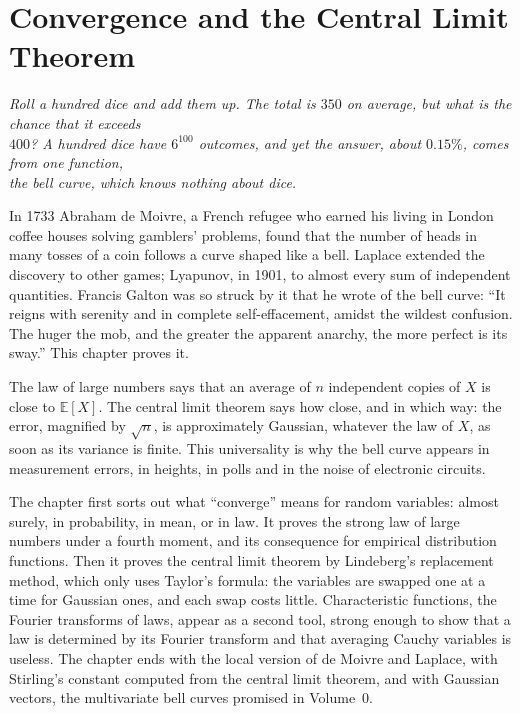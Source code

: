 \chapter{Convergence and the Central Limit Theorem}

\begin{center}\itshape
Roll a hundred dice and add them up. The total is $350$ on average, but what is the chance that it exceeds\\
$400$? A hundred dice have $6^{100}$ outcomes, and yet the answer, about $0.15\%$, comes from one function,\\
the bell curve, which knows nothing about dice.
\end{center}

In 1733 Abraham de Moivre, a French refugee who earned his living in London coffee houses solving gamblers' problems, found that the number of heads
in many tosses of a coin follows a curve shaped like a bell. Laplace extended the discovery to other games; Lyapunov, in 1901, to almost every sum of
independent quantities. Francis Galton was so struck by it that he wrote of the bell curve: ``It reigns with serenity and in complete self-effacement,
amidst the wildest confusion. The huger the mob, and the greater the apparent anarchy, the more perfect is its sway.'' This chapter proves it.

The law of large numbers says that an average of $n$ independent copies of $X$ is close to $\mathbb E[X]$. The central
limit theorem says how close, and in which way: the error, magnified by $\sqrt n$, is approximately Gaussian, whatever
the law of $X$, as soon as its variance is finite. This universality is why the bell curve appears in measurement
errors, in heights, in polls and in the noise of electronic circuits.

The chapter first sorts out what ``converge'' means for random variables: almost surely, in probability, in mean,
or in law. It proves the strong law of large numbers under a fourth moment, and its consequence for empirical
distribution functions. Then it proves the central limit theorem by Lindeberg's replacement method, which only
uses Taylor's formula: the variables are swapped one at a time for Gaussian ones, and each swap costs little.
Characteristic functions, the Fourier transforms of laws, appear as a second tool, strong enough to show that a law
is determined by its Fourier transform and that averaging Cauchy variables is useless. The chapter ends with the
local version of de Moivre and Laplace, with Stirling's constant computed from the central limit theorem, and with
Gaussian vectors, the multivariate bell curves promised in Volume~0.

